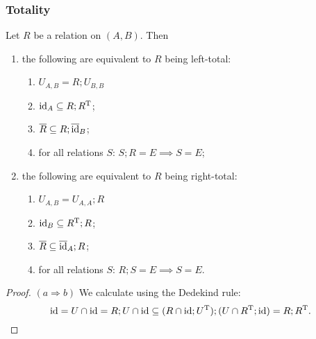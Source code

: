 \subsubsection{Totality}
\begin{lemma} \label{totalityEquivalences}
Let $R$ be a relation on $(A, B)$. Then
\begin{enumerate}
\item the following are equivalent to $R$ being left-total:
\begin{enumerate}
\item $U_{A,B} = R;U_{B,B}$
\item $\operatorname{id}_A \subseteq R;R^{\mathrm{T}}$;
\item $\overline{R}\subseteq R;\overline{\operatorname{id}}_B$;
\item for all relations $S$: $S;R = E \implies S = E$;
\end{enumerate}
\item the following are equivalent to $R$ being right-total:
\begin{enumerate}
\item $U_{A,B} = U_{A,A};R$
\item $\operatorname{id}_B \subseteq R^{\mathrm{T}};R$;
\item $\overline{R}\subseteq \overline{\operatorname{id}}_A;R$;
\item for all relations $S$: $R;S = E \implies S = E$.
\end{enumerate}
\end{enumerate}
\end{lemma}
\begin{proof}
$(a \Rightarrow b)$ We calculate using the Dedekind rule:
\[ \operatorname{id} = U\cap \operatorname{id} = R;U\cap \operatorname{id} \subseteq (R\cap \operatorname{id};U^{\mathrm{T}});(U\cap R^{\mathrm{T}};\operatorname{id}) = R;R^{\mathrm{T}}. \]
\end{proof}

